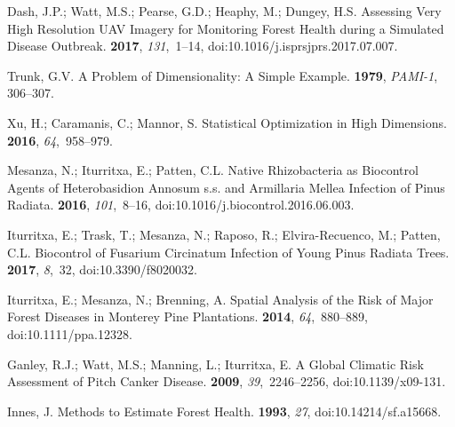 \documentclass[remotesensing,article,accept,moreauthors,pdftex]{Definitions/mdpi}
\begin{document}
\begin{thebibliography}{999}
Dash, J.P.; Watt, M.S.; Pearse, G.D.; Heaphy, M.; Dungey, H.S.
\newblock Assessing Very High Resolution {{UAV}} Imagery for Monitoring Forest
  Health during a Simulated Disease Outbreak.
 {\bf 2017},
  {\em 131},~1--14, doi:10.1016/j.isprsjprs.2017.07.007.

Trunk, G.V.
\newblock A {{Problem}} of {{Dimensionality}}: A {{Simple Example}}.
  {\bf 1979}, {\em PAMI-1}, 306--307.

Xu, H.; Caramanis, C.; Mannor, S.
\newblock Statistical {{Optimization}} in {{High Dimensions}}.
 {\bf 2016}, {\em 64},~958--979.

Mesanza, N.; Iturritxa, E.; Patten, C.L.
\newblock Native Rhizobacteria as Biocontrol Agents of {{Heterobasidion}}
  Annosum s.s. and {{Armillaria}} Mellea Infection of {{Pinus}} Radiata.
 {\bf 2016}, {\em 101},~8--16, doi:10.1016/j.biocontrol.2016.06.003.

Iturritxa, E.; Trask, T.; Mesanza, N.; Raposo, R.; {Elvira-Recuenco}, M.;
  Patten, C.L.
\newblock Biocontrol of {{Fusarium}} Circinatum Infection of Young {{Pinus}}
  Radiata Trees.
 {\bf 2017}, {\em 8},~32, doi:10.3390/f8020032.

Iturritxa, E.; Mesanza, N.; Brenning, A.
\newblock Spatial Analysis of the Risk of Major Forest Diseases in {{Monterey}}
  Pine Plantations.
 {\bf 2014}, {\em 64},~880--889, doi:10.1111/ppa.12328.

Ganley, R.J.; Watt, M.S.; Manning, L.; Iturritxa, E.
\newblock A Global Climatic Risk Assessment of Pitch Canker Disease.
 {\bf 2009}, {\em
  39},~2246--2256, doi:10.1139/x09-131.

Innes, J.
\newblock Methods to Estimate Forest Health.
 {\bf 1993}, {\em 27}, doi:10.14214/sf.a15668.


\end{thebibliography}
\end{document}
